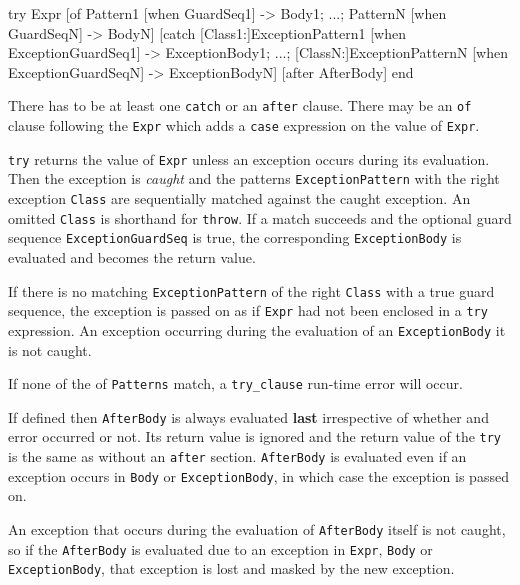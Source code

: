 \begin{erlang}
try Expr [of
    Pattern1 [when GuardSeq1] -> Body1;
    ...;
    PatternN [when GuardSeqN] -> BodyN]
[catch
    [Class1:]ExceptionPattern1 [when ExceptionGuardSeq1] -> ExceptionBody1;
    ...;
    [ClassN:]ExceptionPatternN [when ExceptionGuardSeqN] -> ExceptionBodyN]
[after AfterBody]
end
\end{erlang}

There has to be at least one \texttt{catch} or an \texttt{after}
clause. There may be an \texttt{of} clause following the \texttt{Expr}
which adds a \texttt{case} expression on the value of \texttt{Expr}.

\texttt{try} returns the value of \texttt{Expr} unless an exception
occurs during its evaluation. Then the exception is \emph{caught}
and the patterns \texttt{ExceptionPattern} with the right exception
\texttt{Class} are sequentially matched against the caught exception. An
omitted \texttt{Class} is shorthand for \texttt{throw}. If a match succeeds and the
optional guard sequence \texttt{ExceptionGuardSeq} is true, the
corresponding \texttt{ExceptionBody} is evaluated and becomes the return
value.

If there is no matching \texttt{ExceptionPattern} of the right \texttt{Class}
with a true guard sequence, the exception is passed on as if
\texttt{Expr} had not been enclosed in a \texttt{try} expression. An exception
occurring during the evaluation of an \texttt{ExceptionBody} it is not
caught.

If none of the of \texttt{Patterns} match, a \texttt{try\_clause} run-time
error will occur.

If defined then \texttt{AfterBody} is always evaluated \textbf{last}
irrespective of whether and error occurred or not. Its return value is
ignored and the return value of the \texttt{try} is the same as
without an \texttt{after} section. \texttt{AfterBody} is evaluated
even if an exception occurs in \texttt{Body} or
\texttt{ExceptionBody}, in which case the exception is passed on.


An exception that occurs during the evaluation of \texttt{AfterBody}
itself is not caught, so if the \texttt{AfterBody} is evaluated due to
an exception in \texttt{Expr}, \texttt{Body} or
\texttt{ExceptionBody}, that exception is lost and masked by the new
exception.

